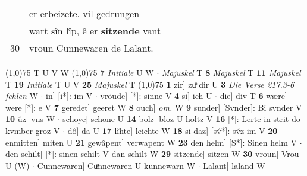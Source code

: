\documentclass[8pt,a4paper,notitlepage]{article}
\begin{document}
\begin{table}[ht]
\begin{minipage}[t]{0.5\linewidth}
\begin{tabular}{rl}
 & er erbeizete. vil gedrungen\\ 
 & wart sîn lîp, ê er \textbf{sitzende} vant\\ 
30 & vroun Cunnewaren de Lalant.\\ 
\end{tabular}
\scriptsize
\line(1,0){75} \newline
T U V W \newline
\line(1,0){75} \newline
\textbf{7} \textit{Initiale} U W   $\cdot$ \textit{Majuskel} T  \textbf{8} \textit{Majuskel} T  \textbf{11} \textit{Majuskel} T  \textbf{19} \textit{Initiale} T U V  \textbf{25} \textit{Majuskel} T  \newline
\line(1,0){75} \newline
\textbf{1} zir] zuͦ dir U \textbf{3} \textit{Die Verse 217.3-6 fehlen} W   $\cdot$ in] [i*]: im V  $\cdot$ vröude] [*]: sinne V \textbf{4} si] ich U  $\cdot$ die] div T \textbf{6} wære] were [*]: e V \textbf{7} geredet] geeret W \textbf{8} ouch] \textit{om.} W \textbf{9} sunder] [Svnder]: Bi svnder V \textbf{10} ûz] vns W  $\cdot$ schoye] schone U \textbf{14} bolz] bloz U holtz V \textbf{16} [*]: Lerte in strit do kvmber groz V  $\cdot$ dô] da U \textbf{17} lîhte] leichte W \textbf{18} si daz] [sv́*]: sv́z im V \textbf{20} enmitten] miten U \textbf{21} gewâpent] verwapent W \textbf{23} den helm] [S*]: Sinen helm V  $\cdot$ den schilt] [*]: sinen schilt V dan schilt W \textbf{29} sitzende] sitzen W \textbf{30} vroun] Vrou U (W)  $\cdot$ Cunnewaren] Cuͦnnewaren U kunnewarn W  $\cdot$ Lalant] laland W \newline
\end{minipage}
\end{table}
\end{document}
